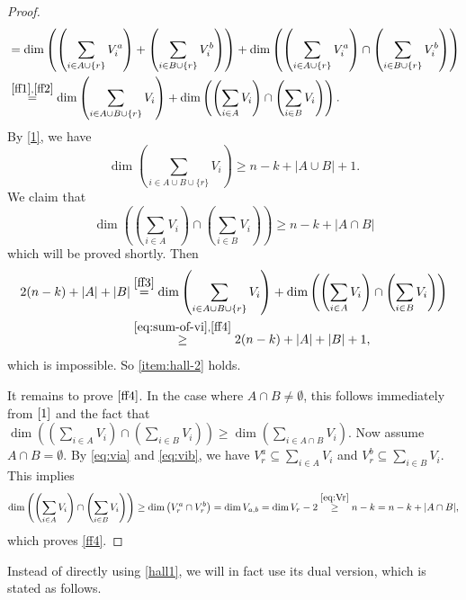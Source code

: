 \documentclass[11pt]{article}
\theoremstyle{plain}
\theoremstyle{definition}
\theoremstyle{remark}
\begin{document}
\begin{proof}
\begin{equation}
\begin{aligned}
&=\dim\left(\left(\sum_{i\in A\cup\{r\}}V_i^a\right)+\left(\sum_{i\in B\cup\{r\}}V_i^b\right)\right)+\dim\left(\left(\sum_{i\in A\cup\{r\}}V_i^a\right)\cap\left(\sum_{i\in B\cup\{r\}}V_i^b\right)\right)\\
&\stackrel{\eqref{ff1},\eqref{ff2}}{=}\dim\left(\sum_{i\in A\cup B\cup \{r\} }V_i\right)+\dim\left(\left(\sum_{i\in A }V_i\right) \cap \left(\sum_{i\in B }V_i\right)\right).
\end{aligned}
\end{equation}
By \eqref{1}, we have 
\begin{equation}\label{eq:sum-of-vi}
\dim\left(\sum_{i\in A\cup B\cup \{r\} }V_i\right)\geq n-k+|A\cup B|+1.
\end{equation} 
We claim that
\begin{equation}\label{ff4}
\dim\left(\left(\sum_{i\in A}V_i\right) \cap \left(\sum_{i\in B}V_i\right)\right)\geq n-k+|A\cap B|
\end{equation}
which will be proved shortly.
Then
\begin{align*}
2(n-k)+|A|+|B|&\stackrel{\eqref{ff3}}{=}
\dim\left(\sum_{i\in A\cup B\cup \{r\} }V_i\right)+\dim\left(\left(\sum_{i\in A}V_i\right) \cap \left(\sum_{i\in B}V_i\right)\right)\\
&\stackrel{\eqref{eq:sum-of-vi},\eqref{ff4}}{\geq} 2(n-k)+|A|+|B|+1,
\end{align*}
which is impossible. So \cref{item:hall-2} holds.

It remains to prove $\eqref{ff4}$. In the case where $A\cap B\neq\emptyset$, this follows immediately from $\eqref{1}$ and the fact that $\dim\left(\left(\sum_{i\in A}V_i\right) \cap \left(\sum_{i\in B}V_i\right)\right)\geq\dim\left(\sum_{i\in A\cap B }V_i\right)$. Now assume $A \cap B=\emptyset$.
By \eqref{eq:via} and \eqref{eq:vib}, we have
$V_r^a\subseteq \sum_{i\in A}V_i$ and
$V_r^b\subseteq \sum_{i\in B}V_i$. This implies 
\[
\dim\left(\left(\sum_{i\in A}V_i\right) \cap \left(\sum_{i\in B}V_i\right)\right)\geq \dim\left(V_r^a\cap V_r^b\right)=\dim V_{a,b}=\dim V_r-2\stackrel{\eqref{eq:Vr}}{\geq} n-k=n-k+|A\cap B|,
\]
which proves \eqref{ff4}.
\end{proof}

Instead of directly using \cref{hall1}, we will in fact use its dual version, which is stated as follows.
\end{document}
